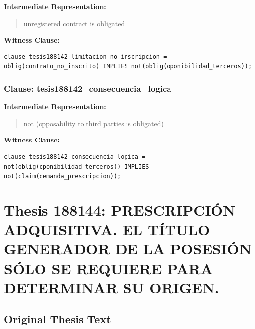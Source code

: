 \documentclass[11pt,a4paper]{article}
\begin{document}
\textbf{Intermediate Representation:}

\begin{quote}
unregistered contract is obligated
\end{quote}

\textbf{Witness Clause:}

\begin{lstlisting}[style=witnessstyle, language=Witness]
clause tesis188142_limitacion_no_inscripcion = oblig(contrato_no_inscrito) IMPLIES not(oblig(oponibilidad_terceros));
\end{lstlisting}

\subsubsection{Clause: tesis188142\_consecuencia\_logica}

\textbf{Intermediate Representation:}

\begin{quote}
not (opposability to third parties is obligated)
\end{quote}

\textbf{Witness Clause:}

\begin{lstlisting}[style=witnessstyle, language=Witness]
clause tesis188142_consecuencia_logica = not(oblig(oponibilidad_terceros)) IMPLIES not(claim(demanda_prescripcion));
\end{lstlisting}

\newpage

\section{Thesis 188144: PRESCRIPCIÓN ADQUISITIVA. EL TÍTULO GENERADOR DE LA POSESIÓN SÓLO SE REQUIERE PARA DETERMINAR SU ORIGEN.}
\label{thesis:188144}

\subsection{Original Thesis Text}
\end{document}
